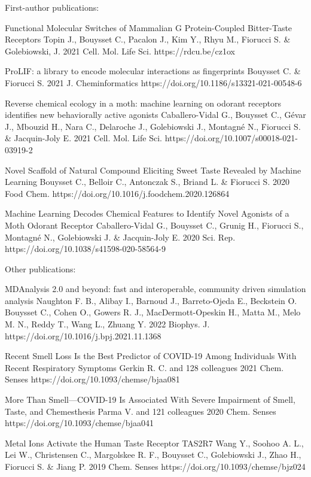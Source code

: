 
\begin{cvpublications}{First-author publications:}

	{Functional Molecular Switches of Mammalian G Protein-Coupled Bitter-Taste Receptors}
	{Topin J., Bouysset C., Pacalon J., Kim Y., Rhyu M., Fiorucci S. \& Golebiowski, J.}
	{2021}
    {Cell. Mol. Life Sci.}
    {https://rdcu.be/cz1ox}

	{ProLIF: a library to encode molecular interactions as fingerprints}
	{Bouysset C. \& Fiorucci S.}
	{2021}
    {J. Cheminformatics}
    {https://doi.org/10.1186/s13321-021-00548-6}

	{Reverse chemical ecology in a moth: machine learning on odorant receptors identifies new behaviorally active agonists}
	{Caballero-Vidal G., Bouysset C., Gévar J., Mbouzid H., Nara C., Delaroche J., Golebiowski J., Montagné N., Fiorucci S. \& Jacquin-Joly E.}
	{2021}
    {Cell. Mol. Life Sci.}
	{https://doi.org/10.1007/s00018-021-03919-2}

	{Novel Scaffold of Natural Compound Eliciting Sweet Taste Revealed by Machine Learning}
	{Bouysset C., Belloir C., Antonczak S., Briand L. \& Fiorucci S.}
	{2020}
	{Food Chem.}
	{https://doi.org/10.1016/j.foodchem.2020.126864}

	{Machine Learning Decodes Chemical Features to Identify Novel Agonists of a Moth Odorant Receptor}
	{Caballero-Vidal G., Bouysset C., Grunig H., Fiorucci S., Montagné N., Golebiowski J. \& Jacquin-Joly E.}
	{2020}
	{Sci. Rep.}
	{https://doi.org/10.1038/s41598-020-58564-9}

\end{cvpublications}

\begin{cvpublications}{Other publications:}

	{MDAnalysis 2.0 and beyond: fast and interoperable, community driven simulation analysis}
	{Naughton F. B., Alibay I., Barnoud J., Barreto-Ojeda E., Beckstein O. Bouysset C., Cohen O., Gowers R. J., MacDermott-Opeskin H., Matta M., Melo M. N., Reddy T., Wang L., Zhuang Y.}
    {2022}
	{Biophys. J.}
    {https://doi.org/10.1016/j.bpj.2021.11.1368}

	{Recent Smell Loss Is the Best Predictor of COVID-19 Among Individuals With Recent Respiratory Symptoms}
	{Gerkin R. C. and 128 colleagues}
    {2021}
	{Chem. Senses}
    {https://doi.org/10.1093/chemse/bjaa081}

	{More Than Smell—COVID-19 Is Associated With Severe Impairment of Smell, Taste, and Chemesthesis}
	{Parma V. and 121 colleagues}
    {2020}
	{Chem. Senses}
    {https://doi.org/10.1093/chemse/bjaa041}

	{Metal Ions Activate the Human Taste Receptor TAS2R7}
	{Wang Y., Soohoo A. L., Lei W., Christensen C., Margolskee R. F., Bouysset C., Golebiowski J., Zhao H., Fiorucci S. \& Jiang P.}
    {2019}
	{Chem. Senses}
    {https://doi.org/10.1093/chemse/bjz024}

\end{cvpublications}
